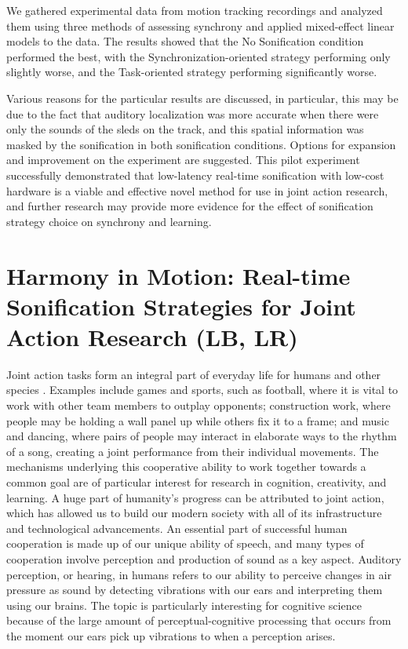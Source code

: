 \documentclass[10pt,a4paper,onecolumn]{article}
\begin{document}
We gathered experimental data from motion tracking recordings and analyzed them using three methods of assessing synchrony and applied mixed-effect linear models to the data. The results showed that the No Sonification condition performed the best, with the Synchronization-oriented strategy performing only slightly worse, and the Task-oriented strategy performing significantly worse.

Various reasons for the particular results are discussed, in particular, this may be due to the fact that auditory localization was more accurate when there were only the sounds of the sleds on the track, and this spatial information was masked by the sonification in both sonification conditions. Options for expansion and improvement on the experiment are suggested. This pilot experiment successfully demonstrated that low-latency real-time sonification with low-cost hardware is a viable and effective novel method for use in joint action research, and further research may provide more evidence for the effect of sonification strategy choice on synchrony and learning.
\clearpage
\twocolumn
{
\hypersetup{linkcolor=Black}
\setcounter{tocdepth}{3}
\tableofcontents
}
\clearpage
\hypertarget{harmony-in-motion-real-time-sonification-strategies-for-joint-action-research-lb-lr}{%
\section{Harmony in Motion: Real-time Sonification Strategies for Joint Action Research (LB, LR)}\label{harmony-in-motion-real-time-sonification-strategies-for-joint-action-research-lb-lr}}

Joint action tasks form an integral part of everyday life for humans \autocite{vanderwelUnderstandingJointAction2021} and other species \autocite{ferrari-tonioloTwoBrainsAction2019}. Examples include games and sports, such as football, where it is vital to work with other team members to outplay opponents; construction work, where people may be holding a wall panel up while others fix it to a frame; and music and dancing, where pairs of people may interact in elaborate ways to the rhythm of a song, creating a joint performance from their individual movements. The mechanisms underlying this cooperative ability to work together towards a common goal are of particular interest for research in cognition, creativity, and learning. A huge part of humanity's progress can be attributed to joint action, which has allowed us to build our modern society with all of its infrastructure and technological advancements. An essential part of successful human cooperation is made up of our unique ability of speech, and many types of cooperation involve perception and production of sound as a key aspect. Auditory perception, or hearing, in humans refers to our ability to perceive changes in air pressure as sound by detecting vibrations with our ears and interpreting them using our brains. The topic is particularly interesting for cognitive science because of the large amount of perceptual-cognitive processing that occurs from the moment our ears pick up vibrations to when a perception arises.
\end{document}
